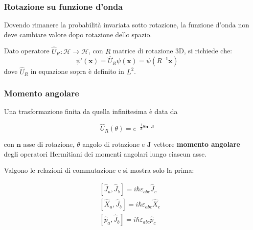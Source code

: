 \documentclass[11pt, a4paper]{scrartcl} %
\numberwithin{equation}{subsection}
\theoremstyle{style2}
\theoremstyle{style1}
\newenvironment{boxenv}[1][]{
    \begin{eqbox}[#1]
    }{
   \end{eqbox}
}
\begin{document}
\subsubsection{Rotazione su funzione d'onda}

Dovendo rimanere la probabilit\`a invariata sotto rotazione, la funzione d'onda non deve cambiare valore dopo rotazione dello spazio. 

Dato operatore $\hat{U}_R:\mathcal{H}\to \mathcal{H}$, con $R$ matrice di rotazione 3D, si richiede che:
\begin{equation}
	\psi '(\mathbf{x} )= \hat{U}_R \psi (\mathbf{x} ) = \psi (R^{-1} \mathbf{x} )
\end{equation}
dove $\hat{U}_R$ in equazione sopra \`e definito in $L^{2} $.

\subsubsection{Momento angolare}
Una trasformazione finita da quella infinitesima \`e data da
\begin{boxenv}[]
\begin{equation}
	\hat{U}_R(\theta ) = e^{-\frac{i}{\hbar }\theta \mathbf{n} \cdot \mathbf{J} } 
\end{equation}
\end{boxenv}
\noindent con $\mathbf{n} $ asse di rotazione, $\theta $ angolo di rotazione e \textbf{J} vettore \textbf{momento angolare} degli operatori Hermitiani dei momenti angolari lungo ciascun asse.

Valgono le relazioni di commutazione e si mostra solo la prima:
\begin{boxenv}[]
\begin{equation}
	\begin{split}
		&[\hat{J}_a, \hat{J}_b] = i\hbar \varepsilon _{abc} \hat{J}_c\\
		& [\hat{X}_a , \hat{J}_b] = i \hbar \varepsilon _{abc} \hat{X}_c\\
		& [\hat{p}_a , \hat{J}_b] = i \hbar \varepsilon _{abc} \hat{p}_c
	\end{split}
\end{equation}
\end{boxenv}
\end{document}

